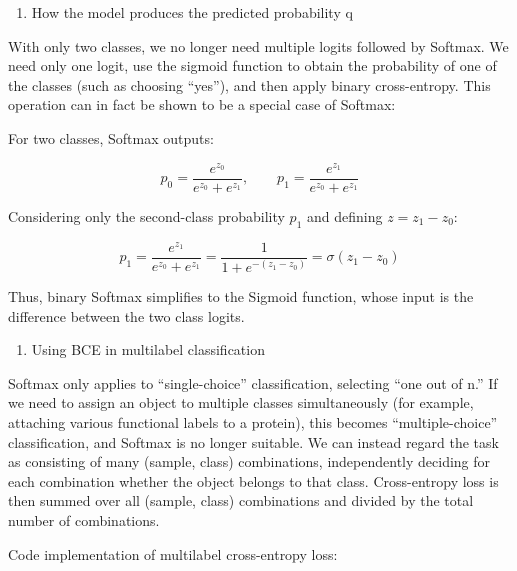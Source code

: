 \begin{enumerate}
\def\labelenumi{\arabic{enumi}.}
\setcounter{enumi}{1}
\tightlist
\item
  How the model produces the predicted probability q
\end{enumerate}

With only two classes, we no longer need multiple logits followed by Softmax. We need only one logit, use the sigmoid function to obtain the probability of one of the classes (such as choosing ``yes''), and then apply binary cross-entropy. This operation can in fact be shown to be a special case of Softmax:

For two classes, Softmax outputs:

\[
p_0=\frac{e^{z_0}}{e^{z_0}+e^{z_1}},\qquad
p_1=\frac{e^{z_1}}{e^{z_0}+e^{z_1}}
\]

Considering only the second-class probability \(p_1\) and defining \(z=z_1-z_0\):

\[
p_1=\frac{e^{z_1}}{e^{z_0}+e^{z_1}}
=\frac{1}{1+e^{-(z_1-z_0)}}
=\sigma(z_1-z_0)
\]

Thus, binary Softmax simplifies to the Sigmoid function, whose input is the difference between the two class logits.

\begin{enumerate}
\def\labelenumi{\arabic{enumi}.}
\setcounter{enumi}{2}
\tightlist
\item
  Using BCE in multilabel classification
\end{enumerate}

Softmax only applies to ``single-choice'' classification, selecting ``one out of n.'' If we need to assign an object to multiple classes simultaneously (for example, attaching various functional labels to a protein), this becomes ``multiple-choice'' classification, and Softmax is no longer suitable. We can instead regard the task as consisting of many (sample, class) combinations, independently deciding for each combination whether the object belongs to that class. Cross-entropy loss is then summed over all (sample, class) combinations and divided by the total number of combinations.

Code implementation of multilabel cross-entropy loss:

